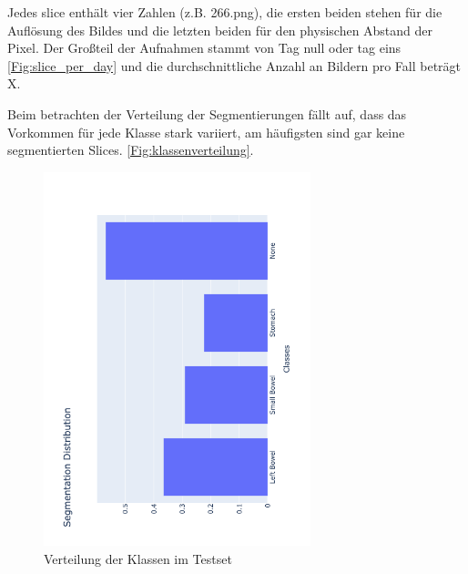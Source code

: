 Jedes slice enthält vier Zahlen (z.B. 266.png), die ersten beiden stehen für die Auflösung des Bildes und die letzten beiden für den physischen Abstand der Pixel. Der Großteil der Aufnahmen stammt von Tag null oder tag eins \autoref{Fig:slice_per_day} und die durchschnittliche Anzahl an Bildern pro Fall beträgt X.

Beim betrachten der Verteilung der Segmentierungen fällt auf, dass das Vorkommen für jede Klasse stark variiert, am häufigsten sind gar keine segmentierten Slices. \autoref{Fig:klassenverteilung}.

\begin{figure}[htb]
	\begin{center}
		\includegraphics[width=220pt , angle=270]{bilder/segmentation_distribution}
		\caption{Verteilung der Klassen im Testset}\label{Fig:klassenverteilung}
	\end{center}
\end{figure}

